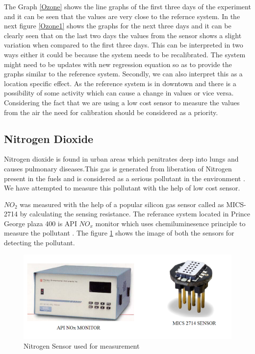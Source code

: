 The Graph \ref{Ozone} shows the line graphs of the first three days of the experiment and it can be seen that the values are very close to the refernce system. In the next figure \ref{Ozone1} shows the graphs for the next three days and it can be clearly seen that on the last two days the values from the sensor shows a slight variation when compared to the first three days. This can be interpreted in two ways either it could be because the system needs to be recalibrated. The system might need to be updates with new regression equation so as to provide the graphs similar to the reference system. Secondly, we can also interpret this as a location specific effect. As the reference system is in downtown and there is a possibility of some activity which can cause a change in values or vice versa. Considering the fact that we are using a low cost sensor to measure the values from the air the need for calibration should be considered as a priority. 







   \subsection{Nitrogen Dioxide}

 Nitrogen dioxide is found in urban areas which penitrates deep into lungs and causes pulmonary diseases.This gas is generated from liberation of Nitrogen present in the fuels and is considered as a serious pollutant in the environment \cite{Salonen2019} \cite{govcanada}. We have attempted to measure this pollutant with the help of low cost sensor. 
 
 $NO_{2}$ was measured with the help of a popular silicon gas sensor called as MICS-2714 by calculating the sensing resistance. The referance system located in Prince George plaza 400 is API $NO_{x}$ monitor \cite{Environment2010} which uses chemiluminesence principle to measure the pollutant . The figure \ref{Nitrogensensor} shows the image of both the sensors for detecting the pollutant.
   
   
   \begin{figure}[h]
    \begin{center}
    \includegraphics[scale=0.70]{images/figure31.png}
    \end{center}
    \caption{Nitrogen Sensor used for measurement}
  \label{Nitrogensensor}
\end{figure}
   
